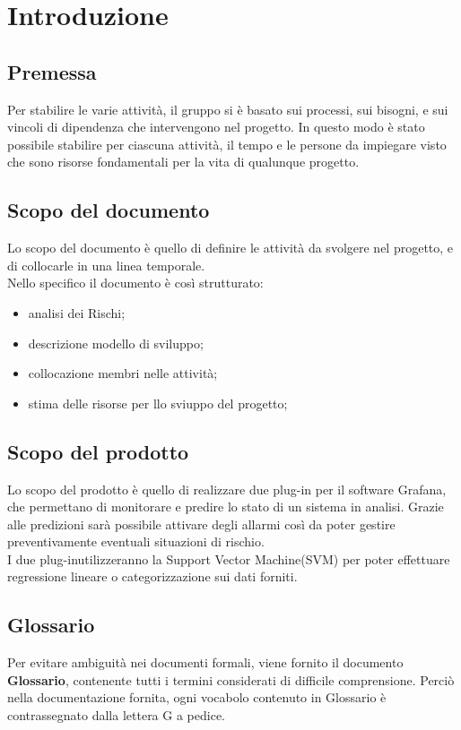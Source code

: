\section{Introduzione}

\subsection{Premessa}
Per stabilire le varie attività, il gruppo si è basato sui processi, sui bisogni, e sui vincoli di dipendenza che intervengono nel progetto. In questo modo è stato possibile stabilire per ciascuna attività, il tempo e le persone da impiegare visto che sono risorse fondamentali per la vita di qualunque progetto.

\subsection{Scopo del documento}
Lo scopo del documento è quello di definire le attività da svolgere nel progetto, e di collocarle in una linea temporale.\\
Nello specifico il documento è così strutturato:
\begin{itemize}
\item analisi dei Rischi;
\item descrizione modello di sviluppo;
\item collocazione membri nelle attività;
\item stima delle risorse per llo sviuppo del progetto;
\end{itemize}
\subsection{Scopo del prodotto}
Lo scopo del prodotto è quello di realizzare due plug-in per il software Grafana\glo, che permettano di monitorare e predire lo stato di un sistema in analisi. Grazie alle predizioni sarà possibile attivare degli allarmi così da poter gestire preventivamente eventuali situazioni di rischio. \\
I due plug-in\glo utilizzeranno la Support Vector Machine\glo (SVM) per poter effettuare regressione lineare o categorizzazione sui dati forniti.
\begin{comment}
I due plug-in\glo utilizzeranno la Support Vector Machine\glo (SVM) o la Regressione Lineare per classificazione o regressione sui dati forniti.
\end{comment}

\subsection{Glossario}
Per evitare ambiguità nei documenti formali, viene fornito il documento \textbf{Glossario},
contenente tutti i termini considerati di difficile comprensione. Perciò nella documentazione fornita, ogni vocabolo contenuto in Glossario è contrassegnato dalla lettera G a pedice.


